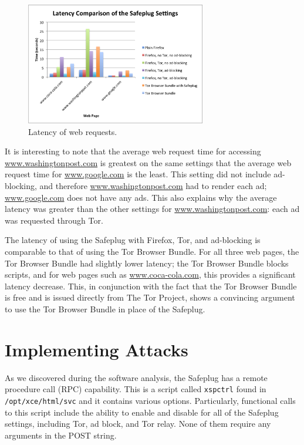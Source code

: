 \documentclass[conference]{IEEEtran}
\begin{document}
\begin{figure}
  \centering
  \includegraphics[width=0.7\textwidth]{graph2}
  \caption{Latency of web requests.}
  \label{fig:latency2}
\end{figure}

It is interesting to note that the average web request time for accessing \url{www.washingtonpost.com} is greatest on the same settings that the average web request time for \url{www.google.com} is the least. This setting did not include ad-blocking, and therefore \url{www.washingtonpost.com} had to render each ad; \url{www.google.com} does not have any ads.  This also explains why the average latency was greater than the other settings for \url{www.washingtonpost.com}: each ad was requested through Tor.   

The latency of using the Safeplug with Firefox, Tor, and ad-blocking is comparable to that of using the Tor Browser Bundle.  For all three web pages, the Tor Browser Bundle had slightly lower latency; the Tor Browser Bundle blocks scripts, and for web pages such as \url{www.coca-cola.com}, this provides a significant latency decrease.  This, in conjunction with the fact that the Tor Browser Bundle is free and is issued directly from The Tor Project, shows a convincing argument to use the Tor Browser Bundle in place of the Safeplug.  

\section{Implementing Attacks}
As we discovered during the software analysis, the Safeplug has a remote procedure call (RPC) capability.  This is a script called \verb!xspctrl! found in \verb!/opt/xce/html/svc! and it contains various options.  Particularly, functional calls to this script include the ability to enable and disable for all of the Safeplug settings, including Tor, ad block, and Tor relay.  None of them require any arguments in the POST string.
\end{document}
